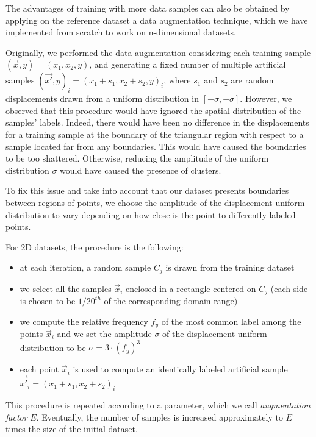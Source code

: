 The advantages of training with more data samples can also be obtained by applying on the reference dataset a data augmentation technique, which we have implemented from scratch to work on n-dimensional datasets.


Originally, we performed the data augmentation considering each training sample $(\vec{x},y) = (x_1, x_2, y)$, and generating a fixed number of multiple artificial samples $(\vec{x'}, y)_i = (x_1 + s_1, x_2 + s_2, y)_i$, where $s_1$ and $s_2$ are random displacements drawn from a uniform distribution in $[-\sigma, +\sigma]$. However, we observed that this procedure would have ignored the spatial distribution of the samples' labels. Indeed, there would have been no difference in the displacements for a training sample at the boundary of the triangular region with respect to a sample located far from any boundaries. This would have caused the boundaries to be too shattered. Otherwise, reducing the amplitude of the uniform distribution $\sigma$ would have caused the presence of clusters.

To fix this issue and take into account that our dataset presents boundaries between regions of points, we choose the amplitude of the displacement uniform distribution to vary depending on how close is the point to differently labeled points. %

For 2D datasets, the procedure is the following:
\begin{itemize}
    \setlength{\itemsep}{0pt}
    \setlength{\parskip}{0pt}
    \setlength{\parsep}{0pt}
    \item at each iteration, a random sample $C_j$ is drawn from the training dataset
    \item we select all the samples $\vec{x}_i$ enclosed in a rectangle centered on $C_j$ (each side is chosen to be $1/20^{th}$ of the corresponding domain range)
    \item we compute the relative frequency $f_y$ of the most common label among the points $\vec{x}_i$ and we set the amplitude $\sigma$ of the displacement uniform distribution to be $\sigma = 3\cdot(f_y)^3$
    \item each point $\vec{x}_i$ is used to compute an identically labeled artificial sample $\vec{x'}_i = ( x_1 + s_1, x_2 + s_2)_i$ 
\end{itemize}
This procedure is repeated according to a parameter, which we call \emph{augmentation factor} $E$. Eventually, the number of samples is increased approximately to $E$ times the size of the initial dataset.

